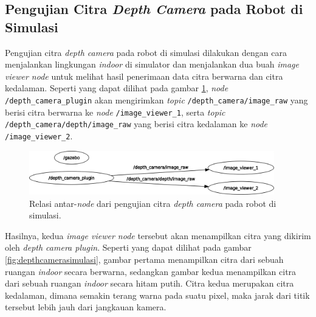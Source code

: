 \subsection{Pengujian Citra \emph{Depth Camera} pada Robot di Simulasi}
\label{subsec:citradepthsimulasi}

Pengujian citra \emph{depth camera} pada robot di simulasi dilakukan dengan cara menjalankan lingkungan \emph{indoor} di simulator dan menjalankan dua buah \emph{image viewer node} untuk melihat hasil penerimaan data citra berwarna dan citra kedalaman.
Seperti yang dapat dilihat pada gambar \ref{fig:rosgraphdepthcameraplugin},
  \emph{node} \lstinline{/depth_camera_plugin} akan mengirimkan \emph{topic} \lstinline{/depth_camera/image_raw} yang berisi citra berwarna ke \emph{node} \lstinline{/image_viewer_1},
  serta \emph{topic} \lstinline{/depth_camera/depth/image_raw} yang berisi citra kedalaman ke \emph{node} \lstinline{/image_viewer_2}.

\begin{figure}[ht]
  \centering
  \includegraphics[width=0.95\textwidth,keepaspectratio]{gambar/rosgraph-depth-camera-plugin.png}
  \caption{Relasi antar-\emph{node} dari pengujian citra \emph{depth camera} pada robot di simulasi.}
  \label{fig:rosgraphdepthcameraplugin}
\end{figure}

Hasilnya, kedua \emph{image viewer node} tersebut akan menampilkan citra yang dikirim oleh \emph{depth camera plugin}.
Seperti yang dapat dilihat pada gambar \ref{fig:depthcamerasimulasi},
  gambar pertama menampilkan citra dari sebuah ruangan \emph{indoor} secara berwarna,
  sedangkan gambar kedua menampilkan citra dari sebuah ruangan \emph{indoor} secara hitam putih.
Citra kedua merupakan citra kedalaman, dimana semakin terang warna pada suatu pixel,
  maka jarak dari titik tersebut lebih jauh dari jangkauan kamera.

